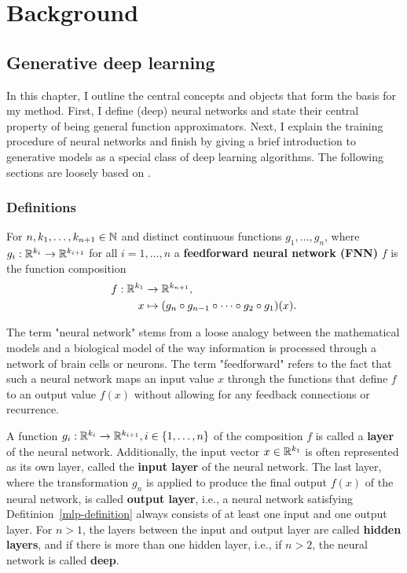 \chapter{Background}\label{chap:background}
\fancyhead[LO]{\nouppercase{\leftmark}}

\section{Generative deep learning}\label{sec:generative_deep_learning}
In this chapter, I outline the central concepts and objects that form the basis for my method. First, I define (deep) neural networks and state their central property of being general function approximators. Next, I explain the training procedure of neural networks and finish by giving a brief introduction to generative models as a special class of deep learning algorithms. The following sections are loosely based on \cite[Chapter~6, pp.~164-194 and 200-209; Chapter~20, pp.~651-662]{Goodfellow2016}.

\subsection{Definitions}\label{sec:NN-basics}

\begin{definition}\label{mlp-definition}
	For $n, k_1,\dots, k_{n+1} \in \mathbb{N}$ and distinct continuous functions $g_1,\dots, g_n$, where $g_i: \mathbb{R}^{k_i} \to \mathbb{R}^{k_{i+1}}$ for all $i=1,\dots, n$ 
	a \textbf{feedforward neural network (FNN)} $f$ is the function composition
		\begin{equation}
			\begin{split}\label{FNN-form}
			f: \mathbb{R}^{k_1} &\to \mathbb{R}^{k_{n+1}}, \\
			x &\mapsto (g_n\circ g_{n-1} \circ \dots \circ g_2\circ g_1)(x).
			\end{split}
		\end{equation}  
\end{definition}

The term "neural network" stems from a loose analogy between the mathematical models and a biological model of the way information is processed through a network of brain cells or neurons.
The term "feedforward" refers to the fact that such a neural network maps an input value $x$ through the functions that define $f$ to an output value $f(x)$ without allowing for any feedback connections or recurrence. 

A function $g_i: \mathbb{R}^{k_i}\to \mathbb{R}^{k_{i+1}}, i\in \lbrace 1, \dots, n\rbrace$ of the composition $f$ is called a \textbf{layer} of the neural network. Additionally, the input vector $x\in \mathbb{R}^{k_1}$ is often represented as its own layer, called the \textbf{input layer} of the neural network. The last layer, where the transformation $g_n$ is applied to produce the final output $f(x)$ of the neural network, is called \textbf{output layer}, i.e., a neural network satisfying Defitinion~\ref{mlp-definition} always consists of at least one input and one output layer. For $n>1$, the layers between the input and output layer are called \textbf{hidden layers}, and if there is more than one hidden layer, i.e., if $n>2$, the neural network is called \textbf{deep}.

